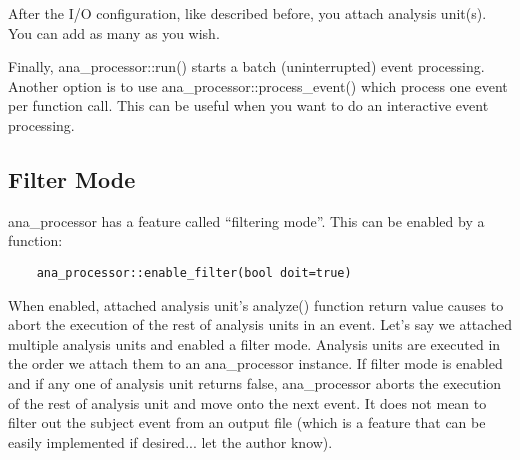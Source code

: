 After the I/O configuration, like described before, you attach analysis unit(s). You can add as many as you wish.

Finally, {\ttfamily ana\_processor::run()} starts a batch (uninterrupted) event processing. Another option is to use {\ttfamily ana\_processor::process\_event()} which process one event per function call. This can be useful when you want to do an interactive event processing.

\subsection{Filter Mode}
\label{sec:analysis:filtermode}
{\ttfamily ana\_processor} has a feature called ``filtering mode''. This can be enabled by a function:
\begin{lstlisting}
    ana_processor::enable_filter(bool doit=true)
\end{lstlisting}
When enabled, attached analysis unit's {\ttfamily analyze()} function return value causes to abort the execution of the rest of analysis units in an event.
Let's say we attached multiple analysis units and enabled a filter mode.
Analysis units are executed in the order we attach them to an {\ttfamily ana\_processor} instance.
If filter mode is enabled and if any one of analysis unit returns false, {\ttfamily ana\_processor} aborts the execution of the rest of analysis unit and move onto the next event.
It does not mean to filter out the subject event from an output file (which is a feature that can be easily implemented if desired... let the author know).
